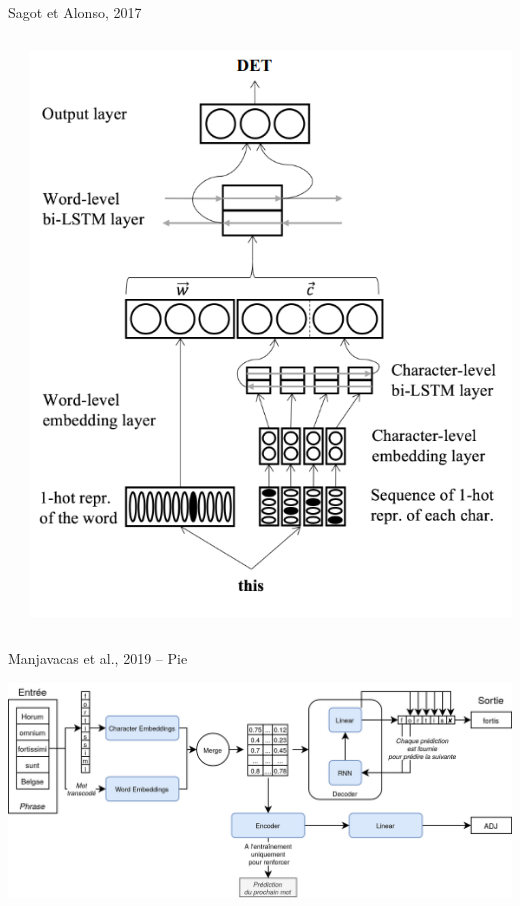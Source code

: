\documentclass[aspectratio=169]{beamer}
\begin{document}
\begin{frame}{Sagot et Alonso, 2017}
    \begin{columns}
        \begin{column}{.5\textwidth}
        \end{column}
        \begin{column}{.5\textwidth}
            \centering
            \includegraphics[height=.8\textheight]{nlp-for-ch/images/Plank.png}
        \end{column}
    \end{columns}
\end{frame}


\begin{frame}{Manjavacas et al., 2019 -- Pie}
    \vspace{1.5em}
    {\tiny {}}
    
    \centering
    \includegraphics[width=.8\linewidth]{nlp-for-ch/images/Pie.png}
\end{frame}
\end{document}
